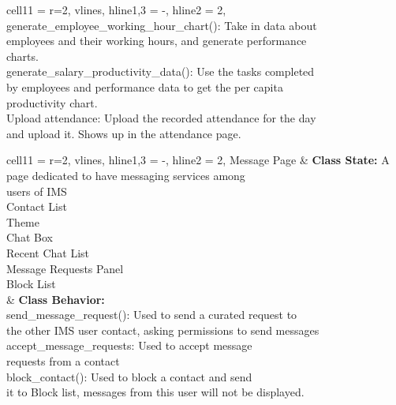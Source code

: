 \documentclass[11pt]{article}
\begin{document}
\begin{longtblr}[
  label = none,
  entry = none,
]{
  cell{1}{1} = {r=2}{},
  vlines,
  hline{1,3} = {-}{},
  hline{2} = {2}{},
}
{\hspace{\dimexpr\labelsep+0.5\tabcolsep}generate\_employee\_working\_hour\_chart(): Take in data about
\\ employees and their working hours, and generate performance\\ charts.\\
\hspace{\dimexpr\labelsep+0.5\tabcolsep}generate\_salary\_productivity\_data(): Use the tasks completed
\\by employees and performance data to get the per capita\\ productivity chart.\\
\hspace{\dimexpr\labelsep+0.5\tabcolsep}Upload attendance: Upload the recorded attendance for the day\\
 and upload it. Shows up in the attendance page.}
\end{longtblr}


\begin{longtblr}[
  label = none,
  entry = none,
]{
  cell{1}{1} = {r=2}{},
  vlines,
  hline{1,3} = {-}{},
  hline{2} = {2}{},
}
Message Page & {\textbf{Class State:} A page dedicated to have messaging services among \\users of IMS\\
\hspace{\dimexpr\labelsep+0.5\tabcolsep}Contact List\\
\hspace{\dimexpr\labelsep+0.5\tabcolsep}Theme\\
\hspace{\dimexpr\labelsep+0.5\tabcolsep}Chat Box\\
\hspace{\dimexpr\labelsep+0.5\tabcolsep}Recent Chat List\\
\hspace{\dimexpr\labelsep+0.5\tabcolsep}Message Requests Panel\\
\hspace{\dimexpr\labelsep+0.5\tabcolsep}Block List}\\
             & {\textbf{Class Behavior:}\\
\hspace{\dimexpr\labelsep+0.5\tabcolsep}send\_message\_request(): Used to send a curated request to \\
the other IMS user contact, asking permissions to send messages\\
\hspace{\dimexpr\labelsep+0.5\tabcolsep}accept\_message\_requests: Used to accept message\\
 requests from a contact\\
\hspace{\dimexpr\labelsep+0.5\tabcolsep}block\_contact(): Used to block a contact and send
\\ it to Block list, messages from this user will not be displayed.}
\end{longtblr}
\end{document}
